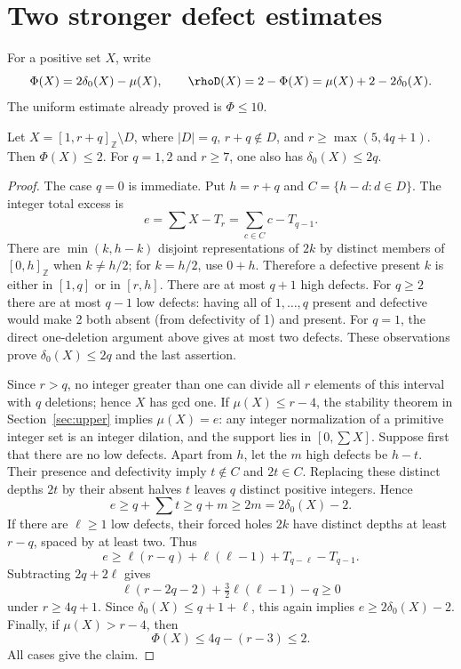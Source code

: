 \section{Two stronger defect estimates}\label{sec:new-defect}
For a positive set $X$, write
\[
\Phi(X)=2\delta_0(X)-\mu(X),\qquad
\rhoD(X)=2-\Phi(X)=\mu(X)+2-2\delta_0(X).
\]
The uniform estimate already proved is $\Phi\leq10$.

\begin{lemma}\label{lem:deleted}
Let $X=[1,r+q]_{\mathbb Z}\setminus D$, where $|D|=q$, $r+q\notin D$,
and $r\geq\max(5,4q+1)$. Then $\Phi(X)\leq2$.
For $q=1,2$ and $r\geq7$, one also has $\delta_0(X)\leq2q$.
\end{lemma}
\begin{proof}
The case $q=0$ is immediate. Put $h=r+q$ and
$C=\{h-d:d\in D\}$. The integer total excess is
\[
e=\sum X-T_r=\sum_{c\in C}c-T_{q-1}.
\]
There are $\min(k,h-k)$ disjoint representations of $2k$ by distinct
members of $[0,h]_{\mathbb Z}$ when $k\ne h/2$; for $k=h/2$, use $0+h$.
Therefore a defective present $k$ is either in $[1,q]$ or in $[r,h]$.
There are at most $q+1$ high defects. For $q\geq2$ there are at most $q-1$
low defects: having all of $1,\ldots,q$ present and defective would make
2 both absent (from defectivity of 1) and present. For $q=1$, the direct
one-deletion argument above gives at most two defects. These observations
prove $\delta_0(X)\leq2q$ and the last assertion.

Since $r>q$, no integer greater than one can divide all $r$ elements
of this interval with $q$ deletions; hence $X$ has gcd one.
If $\mu(X)\leq r-4$, the stability theorem in Section~\ref{sec:upper}
implies $\mu(X)=e$: any integer normalization of a primitive integer set
is an integer dilation, and the support lies in $[0,\sum X]$.
Suppose first that there are no low defects. Apart from $h$, let the $m$
high defects be $h-t$. Their presence and defectivity imply
$t\notin C$ and $2t\in C$. Replacing these distinct depths $2t$ by their
absent halves $t$ leaves $q$ distinct positive integers. Hence
\[
e\geq q+\sum t\geq q+m\geq2m=2\delta_0(X)-2.
\]
If there are $\ell\geq1$ low defects, their forced holes $2k$ have distinct
depths at least $r-q$, spaced by at least two. Thus
\[
e\geq\ell(r-q)+\ell(\ell-1)+T_{q-\ell}-T_{q-1}.
\]
Subtracting $2q+2\ell$ gives
\[
\ell(r-2q-2)+\tfrac32\ell(\ell-1)-q\geq0
\]
under $r\geq4q+1$. Since $\delta_0(X)\leq q+1+\ell$, this again implies
$e\geq2\delta_0(X)-2$.
Finally, if $\mu(X)>r-4$, then
\[
\Phi(X)\leq4q-(r-3)\leq2.
\]
All cases give the claim.
\end{proof}

